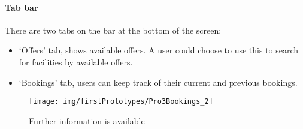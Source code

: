 
\paragraph{Tab bar}

There are two tabs on the bar at the bottom of the screen;
\begin{itemize}
	\item `Offers' tab, shows available offers. A user could choose to use
		this to search for facilities by available offers.
	\item `Bookings' tab, users can keep track of their current and previous
		bookings.
\end{itemize}

\begin{figure}[htpb]
	\centering
	\texttt{[image: img/firstPrototypes/Pro3Bookings\_2]}
	\caption{Further information is available}\label{fig:Pro3Bookings_2}
\end{figure}

\fullwidth%

